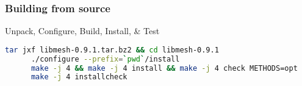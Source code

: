 \begin{frame}[fragile]
  \frametitle{Building \libMesh{} from source}

  \begin{block}{Unpack, Configure, Build, Install, \& Test}
    \begin{lstlisting}[language=bash]
      tar jxf libmesh-0.9.1.tar.bz2 && cd libmesh-0.9.1
      ./configure --prefix=`pwd`/install
      make -j 4 && make -j 4 install && make -j 4 check METHODS=opt
      make -j 4 installcheck
    \end{lstlisting}
\end{block}
\end{frame}

